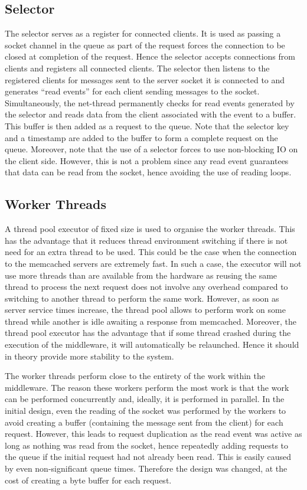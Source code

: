 \documentclass[11pt,a4paper]{article}
\begin{document}
\subsection{Selector}
The selector serves as a register for connected clients. It is used as passing a socket channel in the queue as part of the request forces the connection to be closed at completion of the request. Hence the selector accepts connections from clients and registers all connected clients. The selector then listens to the registered clients for messages sent to the server socket it is connected to and generates ``read events'' for each client sending messages to the socket. Simultaneously, the net-thread permanently checks for read events generated by the selector and reads data from the client associated with the event to a buffer. This buffer is then added as a request to the queue. Note that the selector key and a timestamp are added to the buffer to form a complete request on the queue. Moreover, note that the use of a selector forces to use non-blocking IO on the client side. However, this is not a problem since any read event guarantees that data can be read from the socket, hence avoiding the use of reading loops.

\subsection{Worker Threads}
A thread pool executor of fixed size is used to organise the worker threads. This has the advantage that it reduces thread environment switching if there is not need for an extra thread to be used. This could be the case when the connection to the memcached servers are extremely fast. In such a case, the executor will not use more threads than are available from the hardware as reusing the same thread to process the next request does not involve any overhead compared to switching to another thread to perform the same work. However, as soon as server service times increase, the thread pool allows to perform work on some thread while another is idle awaiting a response from memcached. Moreover, the thread pool executor has the advantage that if some thread crashed during the execution of the middleware, it will automatically be relaunched. Hence it should in theory provide more stability to the system.

The worker threads perform close to the entirety of the work within the middleware. The reason these workers perform the most work is that the work can be performed concurrently and, ideally, it is performed in parallel. In the initial design, even the reading of the socket was performed by the workers to avoid creating a buffer (containing the message sent from the client) for each request. However, this leads to request duplication as the read event was active as long as nothing was read from the socket, hence repeatedly adding requests to the queue if the initial request had not already been read. This is easily caused by even non-significant queue times. Therefore the design was changed, at the cost of creating a byte buffer for each request.
\end{document}
